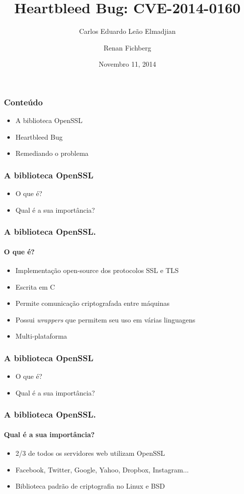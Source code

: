 \documentclass{beamer}
\title[Heartbleed Bug: CVE-2014-0160]{Heartbleed Bug: CVE-2014-0160}
\author{Carlos Eduardo Leão Elmadjian \and Renan Fichberg}
\date{Novembro 11, 2014}
\institute{Instituto de Matemática e Estatística da Universidade de São Paulo (IME-USP)}
\begin{document}
\begin{frame}
	\titlepage
\end{frame}

\begin{frame}
	\frametitle{Conteúdo}
	\begin{itemize}
		\item A biblioteca OpenSSL
		\item Heartbleed Bug
		\item Remediando o problema
	\end{itemize}
\end{frame}

\begin{frame}
	\frametitle{A biblioteca OpenSSL}
	\begin{itemize}
		\item O que é?
		\item Qual é a sua importância?
	\end{itemize}
\end{frame}

\begin{frame}
	\frametitle{A biblioteca OpenSSL.}
	\framesubtitle{O que é?}
	\begin{itemize}
		\item Implementação open-source dos protocolos SSL e TLS
		\item Escrita em C
		\item Permite comunicação criptografada entre máquinas
		\item Possui \textit{wrappers} que permitem seu uso em várias linguagens
		\item Multi-plataforma 
	\end{itemize}
\end{frame}

\begin{frame}
	\frametitle{A biblioteca OpenSSL}
	\begin{itemize}
		\item \textcolor{covered}{O que é?}
		\item Qual é a sua importância?
	\end{itemize}
\end{frame}

\begin{frame}
	\frametitle{A biblioteca OpenSSL.}
	\framesubtitle{Qual é a sua importância?}
	\begin{itemize}
		\item 2/3 de todos os servidores web utilizam OpenSSL
		\item Facebook, Twitter, Google, Yahoo, Dropbox, Instagram...
		\item Biblioteca padrão de criptografia no Linux e BSD
	\end{itemize}
\end{frame}
\end{document}

